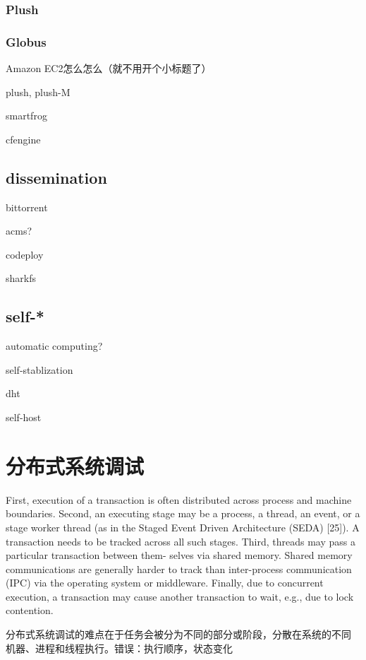 \subsubsection*{Plush}

\subsubsection*{Globus}


Amazon EC2怎么怎么（就不用开个小标题了）

plush, plush-M

smartfrog

cfengine

\subsection{dissemination}

bittorrent

acms?

codeploy

sharkfs

\subsection{self-*}

automatic computing?

self-stablization

dht

self-host

\section{分布式系统调试}

First, execution of a transaction is often distributed across process
and machine boundaries. Second, an executing stage may be a process, a
thread, an event, or a stage worker thread (as in the Staged Event
Driven Architecture (SEDA) [25]). A transaction needs to be tracked
across all such stages. Third, threads may pass a particular
transaction between them- selves via shared memory. Shared memory
communications are generally harder to track than inter-process
communication (IPC) via the operating system or middleware. Finally,
due to concurrent execution, a transaction may cause another
transaction to wait, e.g., due to lock contention.


分布式系统调试的难点在于任务会被分为不同的部分或阶段，分散在系统的不同
机器、进程和线程执行。错误：执行顺序，状态变化

